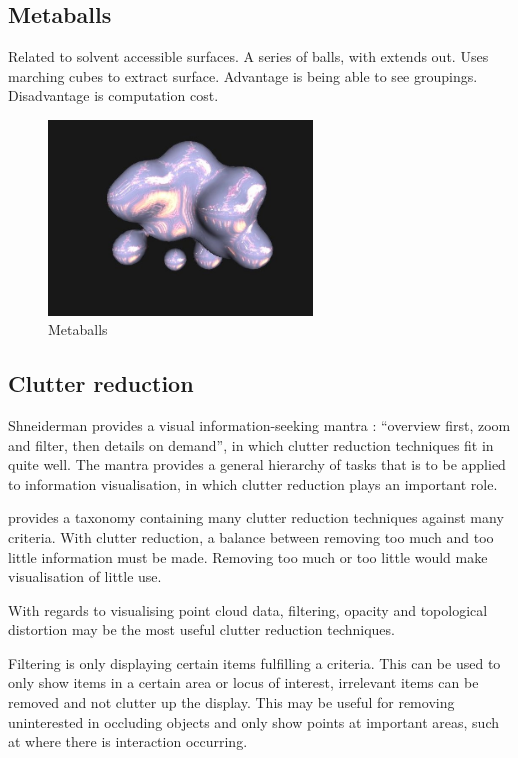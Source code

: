 \documentclass[a4paper]{article}
\begin{document}
\subsection*{Metaballs}
Related to solvent accessible surfaces.
A series of balls, with extends out.
Uses marching cubes to extract surface.
Advantage is being able to see groupings.
Disadvantage is computation cost.

\begin{figure}[h!]
  \begin{center}
    \includegraphics[width=70mm]{metaballs}
  \end{center}
  \caption{Metaballs}
  \label{fig:metaballs}
\end{figure}

\subsection*{Clutter reduction}
Shneiderman provides a visual information-seeking mantra \citep{shneiderman96}:
``overview first, zoom and filter, then details on demand'', in which clutter
reduction techniques fit in quite well. The mantra provides a general hierarchy
of tasks that is to be applied to information visualisation, in which clutter
reduction plays an important role.

\citet{ellis07} provides a taxonomy containing many clutter reduction techniques
against many criteria. With clutter reduction, a balance between removing too
much and too little information must be made. Removing too much or too little
would make visualisation of little use.

With regards to visualising point cloud data, filtering, opacity and topological
distortion may be the most useful clutter reduction techniques.

Filtering is only displaying certain items fulfilling a criteria. This can be
used to only show items in a certain area or locus of interest, irrelevant items
can be removed and not clutter up the display. This may be useful for removing
uninterested in occluding objects and only show points at important areas, such
at where there is interaction occurring.
\end{document}
